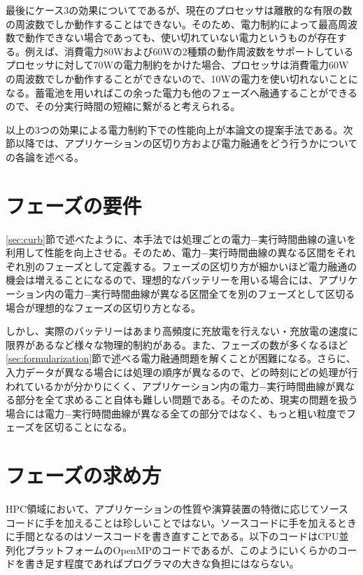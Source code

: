 最後にケース3の効果についてであるが、現在のプロセッサは離散的な有限の数の周波数でしか動作することはできない。そのため、電力制約によって最高周波数で動作できない場合であっても、使い切れていない電力というものが存在する。例えば、消費電力80Wおよび60Wの2種類の動作周波数をサポートしているプロセッサに対して70Wの電力制約をかけた場合、プロセッサは消費電力60Wの周波数でしか動作することができないので、10Wの電力を使い切れないことになる。蓄電池を用いればこの余った電力も他のフェーズへ融通することができるので、その分実行時間の短縮に繋がると考えられる。

以上の3つの効果による電力制約下での性能向上が本論文の提案手法である。次節以降では、アプリケーションの区切り方および電力融通をどう行うかについての各論を述べる。


\section{フェーズの要件}
\label{sec:phase1}

\ref{sec:curb}節で述べたように、本手法では処理ごとの電力−実行時間曲線の違いを利用して性能を向上させる。そのため、電力−実行時間曲線の異なる区間をそれぞれ別のフェーズとして定義する。フェーズの区切り方が細かいほど電力融通の機会は増えることになるので、理想的なバッテリーを用いる場合には、アプリケーション内の電力−実行時間曲線が異なる区間全てを別のフェーズとして区切る場合が理想的なフェーズの区切り方となる。

しかし、実際のバッテリーはあまり高頻度に充放電を行えない・充放電の速度に限界があるなど様々な物理的制約がある。また、フェーズの数が多くなるほど\ref{sec:formularization}節で述べる電力融通問題を解くことが困難になる。さらに、入力データが異なる場合には処理の順序が異なるので、どの時刻にどの処理が行われているかが分かりにくく、アプリケーション内の電力−実行時間曲線が異なる部分を全て求めること自体も難しい問題である。そのため、現実の問題を扱う場合には電力−実行時間曲線が異なる全ての部分ではなく、もっと粗い粒度でフェーズを区切ることになる。

\section{フェーズの求め方}
\label{sec:phase2}

HPC領域において、アプリケーションの性質や演算装置の特徴に応じてソースコードに手を加えることは珍しいことではない。ソースコードに手を加えるときに手間となるのはソースコードを書き直すことである。以下のコードはCPU並列化プラットフォームのOpenMPのコードであるが、このようにいくらかのコードを書き足す程度であればプログラマの大きな負担にはならない。


